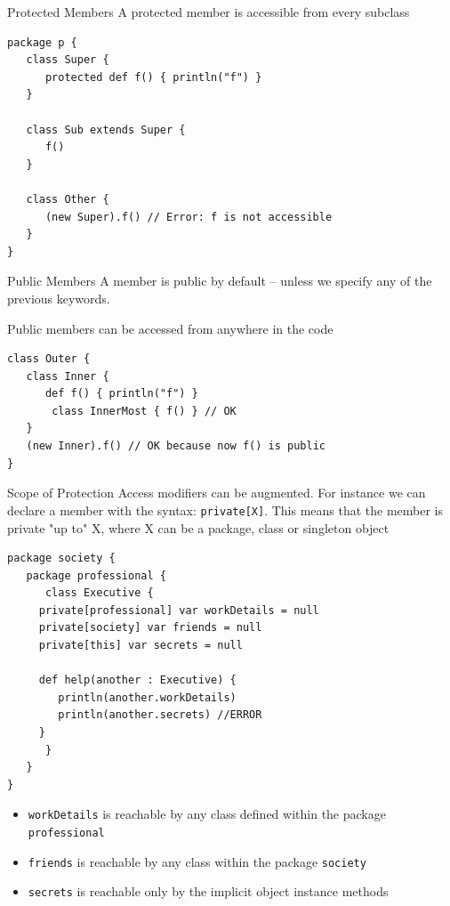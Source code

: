 \documentclass[presentation, aspectratio=169]{beamer}
\begin{document}
\begin{frame}[label={sec:org6486ce7},fragile]{Protected Members}
 A protected member is accessible from every subclass 


\begin{verbatim}
package p {
   class Super {
      protected def f() { println("f") }
   }

   class Sub extends Super {
      f()
   }

   class Other {
      (new Super).f() // Error: f is not accessible
   }
}
\end{verbatim}
\end{frame}

\begin{frame}[label={sec:org60c8c09},fragile]{Public Members}
 A member is public by default -- unless we specify any of the previous keywords.

Public members can be accessed from anywhere in the code

\begin{verbatim}
class Outer {
   class Inner {
      def f() { println("f") }
       class InnerMost { f() } // OK 
   }
   (new Inner).f() // OK because now f() is public
}
\end{verbatim}
\end{frame}

\begin{frame}[label={sec:orga168197},fragile]{Scope of Protection}
 Access modifiers can be augmented. 
For instance we can declare a member with the syntax: \texttt{private[X]}.
This means that the member is private "up to" X, where X can be a package, class or singleton object

\begin{verbatim}
package society {
   package professional {
      class Executive {
	 private[professional] var workDetails = null
	 private[society] var friends = null
	 private[this] var secrets = null

	 def help(another : Executive) {
	    println(another.workDetails)
	    println(another.secrets) //ERROR
	 }
      }
   }
}
\end{verbatim}
\begin{itemize}
\item \texttt{workDetails} is reachable by any class defined within the package \texttt{professional}
\item \texttt{friends} is reachable by any class within the package \texttt{society}
\item \texttt{secrets} is reachable only by the implicit object instance methods
\end{itemize}
\end{frame}
\end{document}
